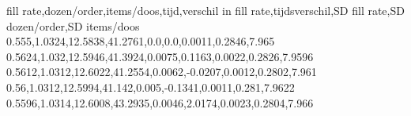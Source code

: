 fill rate,dozen/order,items/doos,tijd,verschil in fill rate,tijdsverschil,SD fill rate,SD dozen/order,SD items/doos
0.555,1.0324,12.5838,41.2761,0.0,0.0,0.0011,0.2846,7.965
0.5624,1.032,12.5946,41.3924,0.0075,0.1163,0.0022,0.2826,7.9596
0.5612,1.0312,12.6022,41.2554,0.0062,-0.0207,0.0012,0.2802,7.961
0.56,1.0312,12.5994,41.142,0.005,-0.1341,0.0011,0.281,7.9622
0.5596,1.0314,12.6008,43.2935,0.0046,2.0174,0.0023,0.2804,7.966
